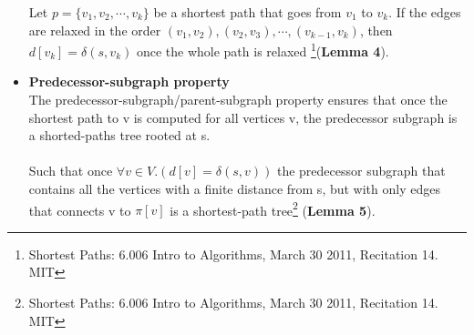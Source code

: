 \documentclass[11pt]{article}
\begin{document}
\begin{itemize}
Let $p = \{v_{1}, v_{2},\cdots ,v_{k}\}$ be a shortest path that goes from $v_{1}$ to $v_{k}$. If the edges are relaxed in the order $(v_{1},v_{2}), (v_{2},v_{3}), \cdots , (v_{k-1}, v_{k})$, then $d[v_{k}] = \delta(s,v_{k})$ once the whole path is relaxed \footnote{Shortest Paths: 6.006 Intro to Algorithms, March 30 2011, Recitation 14. MIT}(\textbf{Lemma 4}).\\
\item \textbf{Predecessor-subgraph property}\\
The predecessor-subgraph/parent-subgraph property ensures that once the shortest path to v is computed for all vertices v, the predecessor subgraph is a shorted-paths tree rooted at s.\\\\
Such that once $\forall v \in V.(d[v] = \delta(s,v))$ the predecessor subgraph that contains all the vertices with a finite distance from s, but with only edges that connects v to $\pi[v]$ is a shortest-path tree\footnote{Shortest Paths: 6.006 Intro to Algorithms, March 30 2011, Recitation 14. MIT} (\textbf{Lemma 5}).
\end{itemize}
\end{document}
